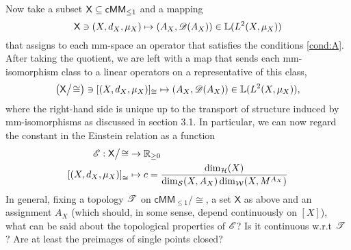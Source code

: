 Now take a subset $\mathsf{X}\subseteq\mathsf{cMM}_{\leq1}$ and a mapping 
\[
  \mathsf{X}\ni(X,d_X,\mu_X) \mapsto (A_X,\mathscr{D}(A_X))\in\mathbb{L}(L^2(X,\mu_X))
\]
that assigns to each mm-space an operator that satisfies the conditions \ref{cond:A}. After taking the quotient, we are left with a map that sends each mm-isomorphism class to a linear operators on a representative of this class,
\[
  \left(\mathsf{X}\big/\!\cong\right) \ni [(X,d_X,\mu_X)]_{\cong}
  \mapsto (A_X,\mathscr{D}(A_X)) \in \mathbb{L}(L^2(X,\mu_X)),
\]
where the right-hand side is unique up to the transport of structure induced by mm-isomorphisms as discussed in section 3.1. In particular, we can now regard the constant in the Einstein relation as a function 
\begin{align}
  \mathscr{E}:\mathsf{X}\big/\!\cong&\to \mathbb{R}_{\geq0}\notag\\
  \left[(X,d_X,\mu_X)\right]_{\cong} &\mapsto 
    c=\frac{\dim_{\mathcal{H}}(X)}{\dim_{\mathcal{S}}(X,A_X)\dim_{\mathcal{W}}(X,M^{A_X})}
\end{align}
In general, fixing a topology $\mathscr{T}$ on $\mathsf{cMM}_{\leq1}\big/\!\cong$, a set $\mathsf{X}$ as above and an assignment 
$A_X$ (which should, in some sense, depend continuously on 
$[X]$), what can be said about the topological properties of 
$\mathscr{E}$? Is it continuous w.r.t $\mathscr{T}$? Are at least the preimages of single points closed?

